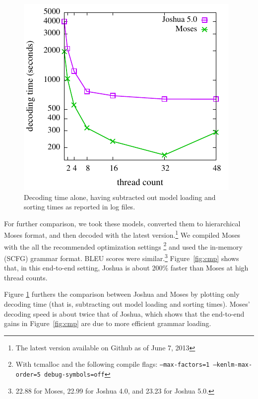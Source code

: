 \documentclass[11pt]{article}
\begin{document}
\begin{figure}[!t]
  \begin{center}
    \includegraphics[width=0.99\linewidth]{plots/decoding-only.pdf}
  \end{center}
  \caption{Decoding time alone, having subtracted out model loading
    and sorting times as reported in log files.}
  \label{fig:decoding-only}
\end{figure}

For further comparison, we took these models, converted them to
hierarchical Moses format, and then decoded with the latest
version.\footnote{The latest version available on Github as of June 7,
  2013} We compiled Moses with the all the recommended optimization
settings \footnote{With tcmalloc and the following compile flags:
  \texttt{--max-factors=1 --kenlm-max-order=5 debug-symbols=off}} and
used the in-memory (SCFG) grammar format.  BLEU scores were
similar.\footnote{22.88 for Moses, 22.99 for Joshua 4.0, and 23.23 for
  Joshua 5.0.}  Figure~\ref{fig:cmp} shows that, in this end-to-end
setting, Joshua is about 200\% faster than Moses at high thread
counts.

Figure \ref{fig:decoding-only} furthers the comparison between Joshua
and Moses by plotting only decoding time (that is, subtracting out
model loading and sorting times). Moses' decoding speed is about twice
that of Joshua, which shows that the end-to-end gains in
Figure~\ref{fig:cmp} are due to more efficient grammar loading.
\end{document}

